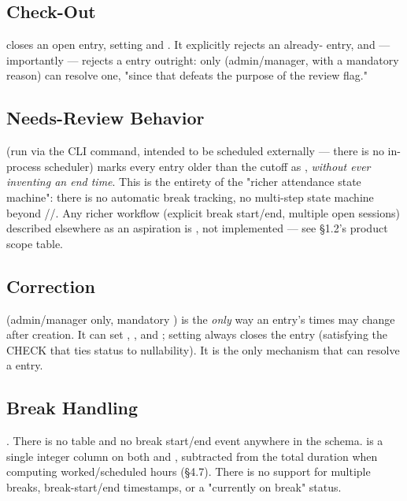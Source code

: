 \subsection*{Check-Out}

closes an open entry, setting  and . It explicitly rejects an already- entry, and ---
importantly --- rejects a  entry outright: only
 (admin/manager, with a mandatory reason) can
resolve one, "since that defeats the purpose of the review flag."

\subsection*{Needs-Review Behavior}

 (run via
the  CLI command, intended to be
scheduled externally --- there is no in-process scheduler) marks every
 entry older than the cutoff as ,
\emph{without ever inventing an end time}. This is the entirety of the
"richer attendance state machine": there is no automatic break
tracking, no multi-step state machine beyond
//. Any richer workflow
(explicit break start/end, multiple open sessions) described elsewhere
as an aspiration is \PLANNED, not implemented --- see \S1.2's product
scope table.

\subsection*{Correction}

 (admin/manager only, mandatory
) is the \emph{only} way an entry's times may change
after creation. It can set , , and
; setting  always closes the
entry (satisfying the CHECK that ties status to 
nullability). It is the only mechanism that can resolve a
 entry.

\subsection*{Break Handling}

\PARTIAL{}. There is no  table and no break
start/end event anywhere in the schema.  is a
single integer column on both  and ,
subtracted from the total duration when computing worked/scheduled
hours (\S4.7). There is no support for multiple breaks, break-start/end
timestamps, or a "currently on break" status.

